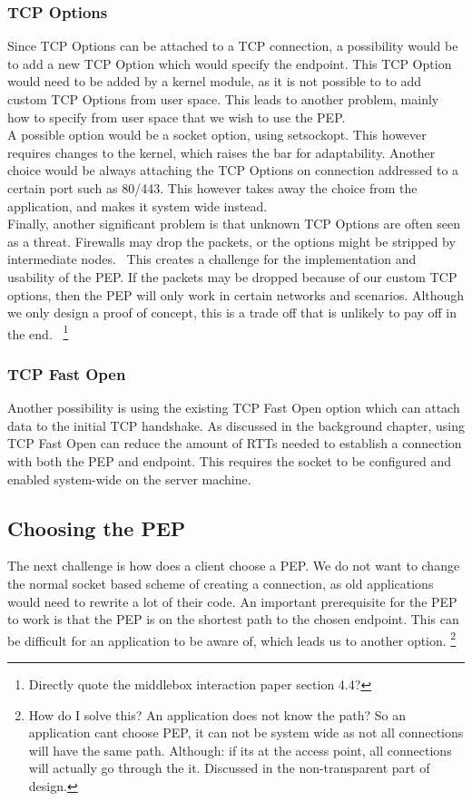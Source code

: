 \documentclass[a4paper,english, 11pt]{report}
\begin{document}
\subsubsection{TCP Options}
Since TCP Options can be attached to a TCP connection, a possibility would be to add a new TCP Option which would specify the endpoint. This TCP Option would need to be added by a kernel module, as it is not possible to to add custom TCP Options from user space. This leads to another problem, mainly how to specify from user space that we wish to use the PEP.\\
A possible option would be a socket option, using setsockopt. This however requires changes to the kernel, which raises the bar for adaptability. Another choice would be always attaching the TCP Options on connection addressed to a certain port such as 80/443. This however takes away the choice from the application, and makes it system wide instead.\\

Finally, another significant problem is that unknown TCP Options are often seen as a threat. Firewalls may drop the packets, or the options might be stripped by intermediate nodes.~\cite{middlebox_interactions} This creates a challenge for the implementation and usability of the PEP. If the packets may be dropped because of our custom TCP options, then the PEP will only work in certain networks and scenarios. Although we only design a proof of concept, this is a trade off that is unlikely to pay off in the end.~\cite{tcp_extendable}
\footnote{Directly quote the middlebox interaction paper section 4.4?}

\subsubsection{TCP Fast Open}
Another possibility is using the existing TCP Fast Open option which can attach data to the initial TCP handshake. As discussed in the background chapter, using TCP Fast Open can reduce the amount of RTTs needed to establish a connection with both the PEP and endpoint. This requires the socket to be configured and enabled system-wide on the server machine.

\subsection{Choosing the PEP}
The next challenge is how does a client choose a PEP. We do not want to change the normal socket based scheme of creating a connection, as old applications would need to rewrite a lot of their code. An important prerequisite for the PEP to work is that the PEP is on the shortest path to the chosen endpoint. This can be difficult for an application to be aware of, which leads us to another option. \footnote{How do I solve this? An application does not know the path? So an application cant choose PEP, it can not be system wide as not all connections will have the same path. Although: if its at the access point, all connections will actually go through the it. Discussed in the non-transparent part of design.}
\end{document}
